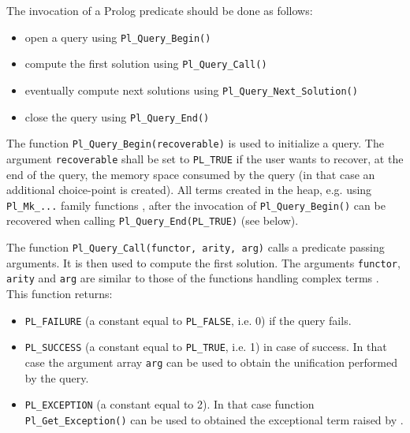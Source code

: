 The invocation of a Prolog predicate should be done as follows:

\begin{itemize}

\item open a query using \texttt{Pl\_Query\_Begin()}

\item compute the first solution using \texttt{Pl\_Query\_Call()}

\item eventually compute next solutions using
\texttt{Pl\_Query\_Next\_Solution()}

\item close the query using \texttt{Pl\_Query\_End()}

\end{itemize}

The function \texttt{Pl\_Query\_Begin(recoverable)} is used to initialize a
query. The argument \texttt{recoverable} shall be set to \texttt{PL\_TRUE} if
the user wants to recover, at the end of the query, the memory space consumed
by the query (in that case an additional choice-point is created). All terms
created in the heap, e.g. using \texttt{Pl\_Mk\_...}  family functions
, after the invocation of
\texttt{Pl\_Query\_Begin()} can be recovered when calling
\texttt{Pl\_Query\_End(PL\_TRUE)} (see below).

The function \texttt{Pl\_Query\_Call(functor, arity, arg)} calls a predicate
passing arguments. It is then used to compute the first solution. The
arguments \texttt{functor}, \texttt{arity} and \texttt{arg} are similar to
those of the functions handling complex terms
. This function returns:

\begin{itemize}

\item \texttt{PL\_FAILURE} (a constant equal to \texttt{PL\_FALSE}, i.e. 0) if
the query fails.

\item \texttt{PL\_SUCCESS} (a constant equal to \texttt{PL\_TRUE}, i.e. 1) in
case of success. In that case the argument array \texttt{arg} can be used to
obtain the unification performed by the query.

\item \texttt{PL\_EXCEPTION} (a constant equal to 2). In that case function
\texttt{Pl\_Get\_Exception()} can be used to obtained the exceptional term
raised by  .

\end{itemize}

